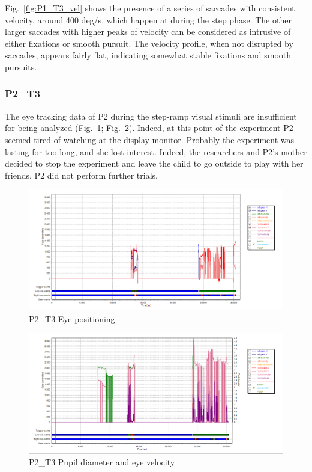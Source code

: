 Fig.~\ref{fig:P1_T3_vel} shows the presence of a series of saccades with consistent velocity, around 400 deg/s, which happen at during the step phase. The other larger saccades with higher peaks of velocity can be considered as intrusive of either fixations or smooth pursuit. The velocity profile, when not disrupted by saccades, appears fairly flat, indicating somewhat stable fixations and smooth pursuits. 



\subsubsection{P2\_T3}
\label{sec:P2_T3}

The eye tracking data of P2 during the step-ramp visual stimuli are insufficient for being analyzed (Fig.~\ref{fig:P2_T3_pos}; Fig.~\ref{fig:P2_T3_vel}). Indeed, at this point of the experiment P2 seemed tired of watching at the display monitor. Probably the experiment was lasting for too long, and she lost interest. Indeed, the researchers and P2’s mother decided to stop the experiment and leave the child to go outside to play with her friends. P2 did not perform further trials.

\begin{figure}[h]
  \centering
  \includegraphics[width=.8\textwidth]{figures/graphs/P2_T3(stepRamp)_XY.png}
  \caption[P2\_T3 Eye positioning]{P2\_T3 Eye positioning}
  \label{fig:P2_T3_pos}
\end{figure}

\begin{figure}[h]
  \centering
  \includegraphics[width=.8\textwidth]{figures/graphs/P2_T3(stepRamp)_VP.png}
  \caption[P2\_T3 pupil velocity]{P2\_T3 Pupil diameter and eye velocity}
  \label{fig:P2_T3_vel}
\end{figure}


